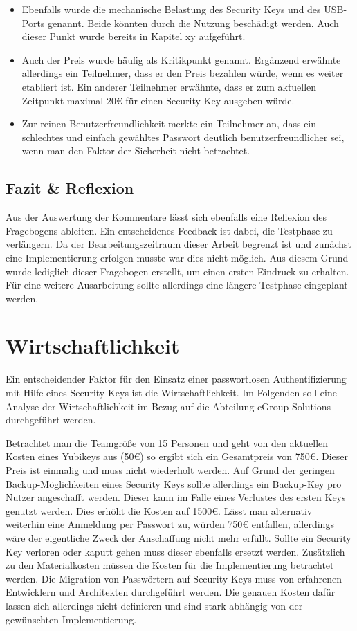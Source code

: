 \begin{itemize}
    \item Ebenfalls wurde die mechanische Belastung des Security Keys und des USB-Ports genannt. Beide könnten durch die Nutzung beschädigt werden. Auch dieser Punkt wurde bereits in Kapitel xy aufgeführt.
    \item Auch der Preis wurde häufig als Kritikpunkt genannt. Ergänzend erwähnte allerdings ein Teilnehmer, dass er den Preis bezahlen würde, wenn es weiter etabliert ist. Ein anderer Teilnehmer erwähnte, dass er zum aktuellen Zeitpunkt maximal 20€ für einen Security Key ausgeben würde.
    \item Zur reinen Benutzerfreundlichkeit merkte ein Teilnehmer an, dass ein schlechtes und einfach gewähltes Passwort deutlich benutzerfreundlicher sei, wenn man den Faktor der Sicherheit nicht betrachtet.
\end{itemize}

\subsection{Fazit \& Reflexion}
Aus der Auswertung der Kommentare lässt sich ebenfalls eine Reflexion des Fragebogens ableiten. Ein entscheidenes Feedback ist dabei, die Testphase zu verlängern. Da der Bearbeitungszeitraum dieser Arbeit begrenzt ist und zunächst eine Implementierung erfolgen musste war dies nicht möglich. Aus diesem Grund wurde lediglich dieser Fragebogen erstellt, um einen ersten Eindruck zu erhalten. Für eine weitere Ausarbeitung sollte allerdings eine längere Testphase eingeplant werden. 


\section{Wirtschaftlichkeit}
Ein entscheidender Faktor für den Einsatz einer passwortlosen Authentifizierung mit Hilfe eines Security Keys ist die Wirtschaftlichkeit. Im Folgenden soll eine Analyse der Wirtschaftlichkeit im Bezug auf die Abteilung cGroup Solutions durchgeführt werden.

Betrachtet man die Teamgröße von 15 Personen und geht von den aktuellen Kosten eines Yubikeys aus (50€) so ergibt sich ein Gesamtpreis von 750€. Dieser Preis ist einmalig und muss nicht wiederholt werden. Auf Grund der geringen Backup-Möglichkeiten eines Security Keys sollte allerdings ein Backup-Key pro Nutzer angeschafft werden. Dieser kann im Falle eines Verlustes des ersten Keys genutzt werden. Dies erhöht die Kosten auf 1500€.
Lässt man alternativ weiterhin eine Anmeldung per Passwort zu, würden 750€ entfallen, allerdings wäre der eigentliche Zweck der Anschaffung nicht mehr erfüllt.
Sollte ein Security Key verloren oder kaputt gehen muss dieser ebenfalls ersetzt werden.
Zusätzlich zu den Materialkosten müssen die Kosten für die Implementierung betrachtet werden. Die Migration von Passwörtern auf Security Keys muss von erfahrenen Entwicklern und Architekten durchgeführt werden. Die genauen Kosten dafür lassen sich allerdings nicht definieren und sind stark abhängig von der gewünschten Implementierung. 

